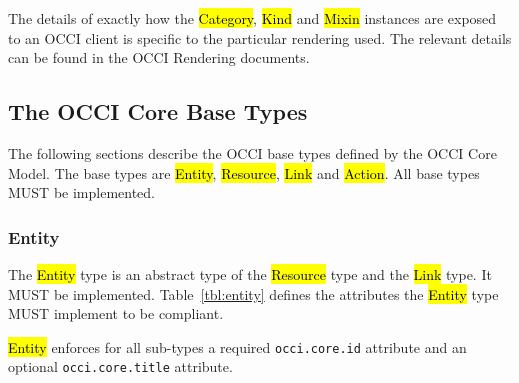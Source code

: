 \documentclass[10pt,a4paper]{article}
\begin{document}
The details of exactly how the \hl{Category}, \hl{Kind} and \hl{Mixin}
instances are exposed to an OCCI client is specific to the particular
rendering used.
The relevant details can be found in the OCCI Rendering documents.

\subsection{The OCCI Core Base Types}
\label{sec:base_types}
The following sections describe the OCCI base types defined by the
OCCI Core Model.  The base types are \hl{Entity}, \hl{Resource},
\hl{Link} and \hl{Action}. All base types MUST be implemented.

\subsubsection{Entity}
\label{sec:entity}
The \hl{Entity} type is an abstract type of the \hl{Resource} type and
the \hl{Link} type. It MUST be implemented.
%
Table~\ref{tbl:entity} defines the attributes the \hl{Entity} type
MUST implement to be compliant.
%

\hl{Entity} enforces for all sub-types a required \texttt{occi.core.id}
attribute and an optional \texttt{occi.core.title} attribute.
\end{document}
